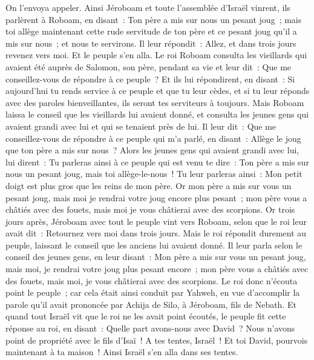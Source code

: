 \begin{multicols}{2}
On l'envoya appeler. Ainsi Jéroboam et toute l'assemblée d'Israël vinrent, ils parlèrent à Roboam, en disant~:
Ton père a mis sur nous un pesant joug~; mais toi allège maintenant cette rude servitude de ton père et ce pesant joug qu'il a mis sur nous~; et nous te servirons.
Il leur répondit~: Allez, et dans trois jours revenez vers moi. Et le peuple s'en alla.
Le roi Roboam consulta les vieillards qui avaient été auprès de Salomon, son père, pendant sa vie et leur dit~: Que me conseillez-vous de répondre à ce peuple~?
Et ils lui répondirent, en disant~: Si aujourd'hui tu rends service à ce peuple et que tu leur cèdes, et si tu leur réponds avec des paroles bienveillantes, ils seront tes serviteurs à toujours.
Mais Roboam laissa le conseil que les vieillards lui avaient donné, et consulta les jeunes gens qui avaient grandi avec lui et qui se tenaient près de lui.
Il leur dit~: Que me conseillez-vous de répondre à ce peuple qui m'a parlé, en disant~: Allège le joug que ton père a mis sur nous~?
Alors les jeunes gens qui avaient grandi avec lui, lui dirent~: Tu parleras ainsi à ce peuple qui est venu te dire~: Ton père a mis sur nous un pesant joug, mais toi allège-le-nous~! Tu leur parleras ainsi~: Mon petit doigt est plus gros que les reins de mon père.
Or mon père a mis sur vous un pesant joug, mais moi je rendrai votre joug encore plus pesant~; mon père vous a châtiés avec des fouets, mais moi je vous châtierai avec des scorpions.
Or trois jours après, Jéroboam avec tout le peuple vint vers Roboam, selon que le roi leur avait dit~: Retournez vers moi dans trois jours.
Mais le roi répondit durement au peuple, laissant le conseil que les anciens lui avaient donné.
Il leur parla selon le conseil des jeunes gens, en leur disant~: Mon père a mis sur vous un pesant joug, mais moi, je rendrai votre joug plus pesant encore~; mon père vous a châtiés avec des fouets, mais moi, je vous châtierai avec des scorpions.
Le roi donc n'écouta point le peuple~; car cela était ainsi conduit par Yahweh, en vue d'accomplir la parole qu'il avait prononcée par Achija de Silo, à Jéroboam, fils de Nebath.
Et quand tout Israël vit que le roi ne les avait point écoutés, le peuple fit cette réponse au roi, en disant~: Quelle part avons-nous avec David~? Nous n'avons point de propriété avec le fils d'Isaï~! A tes tentes, Israël~! Et toi David, pourvois maintenant à ta maison~! Ainsi Israël s'en alla dans ses tentes.

\end{multicols}
